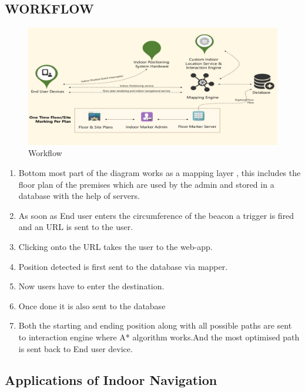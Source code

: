 \documentclass[a4paper, 12pt]{article}
\begin{document}
\subsection{WORKFLOW}
\begin{figure}[h!]
    \centering
    \includegraphics[width = 6in]{2.png}
    \caption{Workflow}
    \label{fig: blockbit}
\end{figure}
\begin{enumerate}
	\item 	Bottom most part of the diagram works as a mapping layer , this includes the floor plan of the premises which are used by the admin and stored in a database with the help of servers.
	\item 	As soon as End user enters the circumference of the beacon a trigger is fired and an URL is sent to the user.
	\item 	Clicking onto the URL takes the user to the web-app.
	\item 	Position detected is first sent to the database via mapper.
	\item 	Now users have to enter the destination.
	\item 	Once done it is also sent to the database 
	\item 	Both the starting and ending position along with all possible paths are sent to interaction engine where A* algorithm works.And the most optimised path is sent back to End user device.
\end{enumerate}

\newpage
\begin{center}
	\section{Applications of Indoor Navigation}
\end{center}
\end{document}
